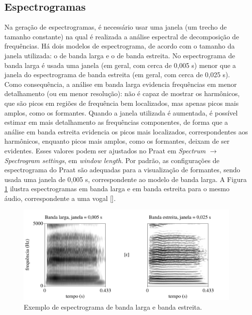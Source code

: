 \documentclass[portuguese]{textolivre}
\begin{document}
\subsection{Espectrogramas}\label{sec-espectrogramas}
Na geração de espectrogramas, é necessário usar uma janela (um trecho de tamanho constante) na qual é realizada a análise espectral de decomposição de frequências. Há dois modelos de espectrograma, de acordo com o tamanho da janela utilizada: o de banda larga e o de banda estreita. No espectrograma de banda larga é usada uma janela (em geral, com cerca de 0,005 s) menor que a janela do espectrograma de banda estreita (em geral, com cerca de 0,025 s). Como consequência, a análise em banda larga evidencia frequências em menor detalhamento (ou em menor resolução): não é capaz de mostrar os harmônicos, que são picos em regiões de frequência bem localizados, mas apenas picos mais amplos, como os formantes. Quando a janela utilizada é aumentada, é possível estimar em mais detalhamento as frequências componentes, de forma que a análise em banda estreita evidencia os picos mais localizados, correspondentes aos harmônicos, enquanto picos mais amplos, como os formantes, deixam de ser evidentes. Esses valores podem ser ajustados no Praat em \textit{Spectrum $\rightarrow$ Spectrogram settings}, em \textit{window length}. Por padrão, as configurações de espectrograma do Praat são adequadas para a visualização de formantes, sendo usada uma janela de 0,005 s, correspondente ao modelo de banda larga. A Figura \ref{fig13} ilustra espectrogramas em banda larga e em banda estreita para o mesmo áudio, correspondente a uma vogal [].

\begin{figure}[htbp]
 \centering
 \includegraphics[width=1\textwidth]{Fig13.pdf}
 \caption{Exemplo de espectrograma de banda larga e banda estreita.}
 \label{fig13}
\end{figure}
\end{document}
